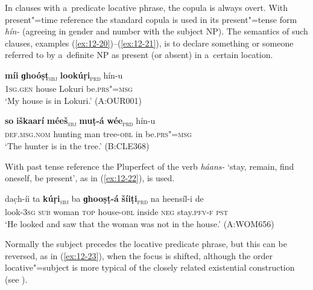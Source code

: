 In clauses with a~predicate locative phrase, the copula is always overt. With present"=time reference the standard copula is used in its present"=tense form \textit{hín-} (agreeing in gender and number with the subject NP). The semantics of such clauses, examples (\ref{ex:12-20})--(\ref{ex:12-21}), is to declare something or someone referred to by a~definite NP as present (or absent) in a~certain location.

\begin{exe}
\ex
\label{ex:12-20}
\gll {\ob}\textbf{míi} \textbf{ɡhoóṣṭ}{\cb}\textsubscript{\textsc{\upshape sbj}} {\ob}\textbf{lookúṛi}{\cb}\textsubscript{\textsc{\upshape prd}} hín-u \\
\textsc{1sg.gen} house Lokuri be.\textsc{prs"=msg} \\
\glt `My house is in Lokuri.' (A:OUR001)
\end{exe}
\begin{exe}
\ex
\label{ex:12-21}
\gll {\ob}\textbf{so} \textbf{iškaarí} \textbf{méeš}{\cb}\textsubscript{\textsc{\upshape sbj}} {\ob}\textbf{muṭ-á} \textbf{wée}{\cb}\textsubscript{\textsc{\upshape prd}} hín-u \\
\textsc{def.msg.nom} hunting man tree-\textsc{obl} in be.\textsc{prs"=msg} \\
\glt `The hunter is in the tree.' (B:CLE368)
\end{exe}

With past tense reference the Pluperfect of the verb \textit{háans-} `stay, remain, find oneself, be present', as in (\ref{ex:12-22}), is used.

\begin{exe}
\ex
\label{ex:12-22}
\gll dac̣h-íi ta {\ob}\textbf{kúṛi}{\cb}\textsubscript{\textsc{\upshape sbj}} ba {\ob}\textbf{ɡhooṣṭ-á} \textbf{šíiṭi}{\cb}\textsubscript{\textsc{\upshape prd}} na heensíl-i de \\
look-3\textsc{sg} \textsc{sub} woman \textsc{top} house-\textsc{obl} inside \textsc{neg} stay.\textsc{pfv-f} \textsc{pst} \\
\glt `He looked and saw that the woman was not in the house.' (A:WOM656)
\end{exe}

Normally the subject precedes the locative predicate phrase, but this can be reversed, as in (\ref{ex:12-23}), when the focus is shifted, although the order locative"=subject is more typical of the closely related existential construction (see ).


